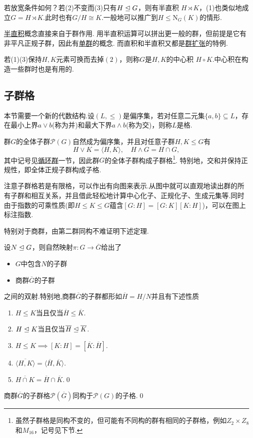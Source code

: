 \begin{remark}
	若放宽条件如何？若(2)不变而(3)只有$H\trianglelefteq G$，则有{\heiti 半直积} $H\rtimes K$，(1)也类似地成立$G=H\rtimes K$.此时也有$G/H\cong K$.一般地可以推广到$H\le\mathrm{N}_G(K)$的情形.

	\hyperlink{text:Semidirect}{半直积}概念直接来自于群作用.
	用半直积运算可以拼出更一般的群，但前提是它有非平凡正规子群，因此有\hyperlink{text:Simple}{单群}的概念.
	而直积和半直积又都是\hyperref[subsec:GroupExtension]{群扩张}的特例.

	若(1)(3)保持$H,K$元素可换而去掉$(2)$，则称$G$是$H,K$的{\heiti 中心积} $H\circ K$.中心积在构造一些群时也是有用的.
\end{remark}
\subsection{子群格}
本节需要一个新的代数结构.设$(L,\le)$是偏序集，若对任意二元集$\{a,b\}\subseteq L$，存在最小上界$a\vee b$(称为{\heiti 并})和最大下界$a\wedge b$(称为{\heiti 交})，则称$L$是{\heiti 格}.

群$G$的全体子群$\mathcal{P}(G)$自然成为偏序集，并且对任意子群$H,K\le G$有
\[
	H\vee K=\langle H,K\rangle ,\quad H\wedge G=H\cap G,
\]
其中记号见\hyperref[subsec:cyclic]{循环群}一节，因此群$G$的全体子群构成{\heiti 子群格}\footnote{虽然子群格是同构不变的，但可能有不同构的群有相同的子群格，例如$Z_2\times Z_8$和$M_{16}$，记号见下节.}.
特别地，交和并保持正规性，即全体正规子群构成子格.

注意子群格若是有限格，可以作出有向图来表示.从图中就可以直观地读出群的所有子群和相互关系，并且借此轻松地计算中心化子、正规化子、生成元集等.同时由于指数的可乘性质(即$H\le K\le G$蕴含$[G:H]=[G:K][K:H]$)，可以在图上标注指数.

特别对于商群，由第二群同构不难证明下述定理.
\begin{thm}[(子群格同构)]
	设$N\trianglelefteq G$，则自然映射$\pi\colon G\to\overline{G}$给出了\hypertarget{thm:LatticeIso}{}
	\begin{itemize}
		\item $G$中包含$N$的子群
		\item 商群$\overline{G}$的子群
	\end{itemize}
	之间的双射.特别地,商群$\overline{G}$的子群都形如$\overline{H}=H/N$并且有下述性质
	\begin{enumerate}
		\item $H\le K$当且仅当$\overline{H}\le\overline{K}$.
		\item $H\trianglelefteq K$当且仅当$\overline{H}\trianglelefteq\overline{K}$.
		\item $H\le K\implies[K:H]=[\overline{K}:\overline{H}]$.
		\item $\overline{\langle H,K\rangle }=\langle \overline{H},\overline{K}\rangle $.
		\item $\overline{H\cap K}=\overline{H}\cap\overline{K}$.\qed
	\end{enumerate}
\end{thm}
\begin{cor*}
	商群$\overline{G}$的子群格$\mathcal{P}(\overline{G})$同构于$\mathcal{P}(G)$的子格.\qed
\end{cor*}

